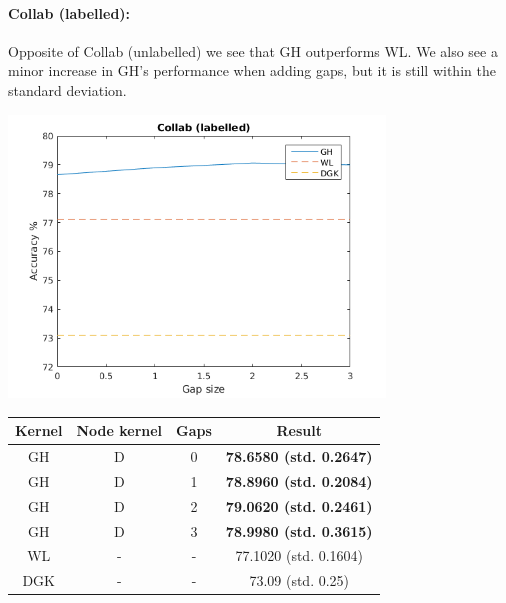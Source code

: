 \documentclass{article}
\begin{document}
\paragraph{Collab (labelled):}
Opposite of Collab (unlabelled) we see that GH outperforms WL. We also see a minor increase in GH's performance when adding gaps, but it is still within the standard deviation. \\
\begin{minipage}{0.6\linewidth}
	\hspace*{-1in}
	\includegraphics[width=10cm]{collab_labelled}
	\label{fig:collab}
\end{minipage}
\begin{minipage}[c]{0.5\linewidth}
	
	\centering
	\begin{tabular}{c|c|c|c}
		Kernel & Node kernel & Gaps & Result\\
		\hline
		GH & D & 0 & \textbf{78.6580 (std. 0.2647)}\\
		GH & D & 1 & \textbf{78.8960 (std. 0.2084)}\\
		GH & D & 2 & \textbf{79.0620 (std. 0.2461)} \\
		GH & D & 3 & \textbf{78.9980 (std. 0.3615)}\\
		WL & - & - & 77.1020 (std. 0.1604) \\
		DGK\cite{yanardag} & - & - & 73.09 (std. 0.25)\\
	\end{tabular}
	\label{table:collab}
\end{minipage}
\end{document}
